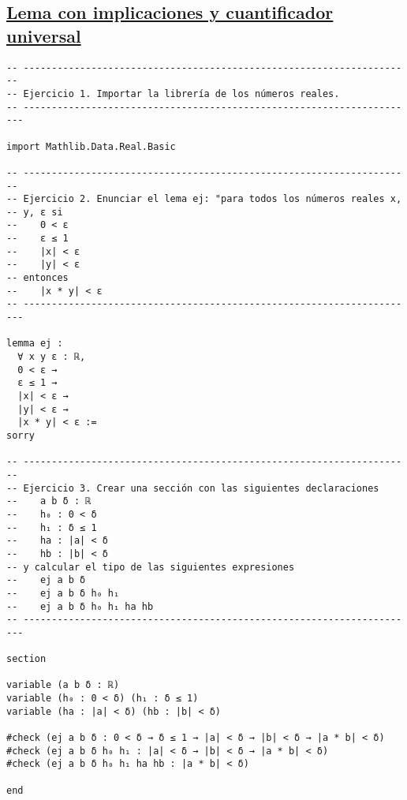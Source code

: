 \subsection{\href{./src/Logica/Lema\_con\_implicaciones\_y\_cuantificador\_universal.lean}{Lema con implicaciones y cuantificador universal}}
\label{sec:orga0862cf}
\begin{verbatim}
-- ---------------------------------------------------------------------
-- Ejercicio 1. Importar la librería de los números reales.
-- ----------------------------------------------------------------------

import Mathlib.Data.Real.Basic

-- ---------------------------------------------------------------------
-- Ejercicio 2. Enunciar el lema ej: "para todos los números reales x,
-- y, ε si
--    0 < ε
--    ε ≤ 1
--    |x| < ε
--    |y| < ε
-- entonces
--    |x * y| < ε
-- ----------------------------------------------------------------------

lemma ej :
  ∀ x y ε : ℝ,
  0 < ε →
  ε ≤ 1 →
  |x| < ε →
  |y| < ε →
  |x * y| < ε :=
sorry

-- ---------------------------------------------------------------------
-- Ejercicio 3. Crear una sección con las siguientes declaraciones
--    a b δ : ℝ
--    h₀ : 0 < δ
--    h₁ : δ ≤ 1
--    ha : |a| < δ
--    hb : |b| < δ
-- y calcular el tipo de las siguientes expresiones
--    ej a b δ
--    ej a b δ h₀ h₁
--    ej a b δ h₀ h₁ ha hb
-- ----------------------------------------------------------------------

section

variable (a b δ : ℝ)
variable (h₀ : 0 < δ) (h₁ : δ ≤ 1)
variable (ha : |a| < δ) (hb : |b| < δ)

#check (ej a b δ : 0 < δ → δ ≤ 1 → |a| < δ → |b| < δ → |a * b| < δ)
#check (ej a b δ h₀ h₁ : |a| < δ → |b| < δ → |a * b| < δ)
#check (ej a b δ h₀ h₁ ha hb : |a * b| < δ)

end
\end{verbatim}

